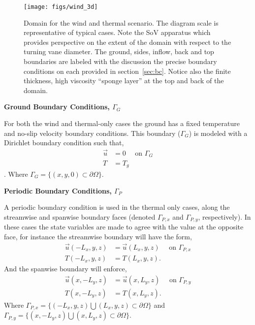 \begin{figure}[!htb]
  \begin{center}
   \texttt{[image: figs/wind\_3d]}
    \caption{Domain for the wind and thermal scenario. The diagram scale
   is representative of typical cases. Note the SoV apparatus which
   provides perspective on the extent of the domain with respect to the
   turning vane diameter. The ground, sides, inflow, back and top
   boundaries are labeled with the discussion the precise boundary
   conditions on each provided in section~\ref{sec:bc}. Notice also the
   finite thickness, high viscosity ``sponge layer'' at the top and back
   of the domain.}   
    \label{fig:wind3d}
  \end{center}
\end{figure}

\textbf{Ground Boundary Conditions, $\Gamma_G$} 

For both the wind and thermal-only cases the ground has a fixed
temperature and no-slip velocity boundary conditions. This boundary 
($\Gamma_G$) is modeled with a Dirichlet boundary condition such that, 
\begin{align}
 \overrightarrow{u} &= 0 \quad \text{ on } \Gamma_G \\
 T &= T_g
\end{align}. 
Where $\Gamma_G = \{(x,y,0) \subset \partial \Omega \} $. 

%
%
%
\textbf{Periodic Boundary Conditions, $\Gamma_P$} 

A periodic boundary condition is used in the thermal only cases, 
along the streamwise and spanwise boundary faces 
(denoted $\Gamma_{P,x}$ and $\Gamma_{P,y}$, respectively). In these cases the state variables 
are made to agree with the value at the opposite face, for instance the 
streamwise boundary will have the form, 
\begin{align}
 \overrightarrow{u}(-L_x,y,z) &= \overrightarrow{u}(L_x,y,z) \quad \text{ on } \Gamma_{P,x} \\
 T(-L_x,y,z) &= T(L_x,y,z). 
\end{align}
And the spanwise boundary will enforce, 
\begin{align}
 \overrightarrow{u}(x,-L_y,z) &= \overrightarrow{u}(x,L_y,z) \quad \text{ on } \Gamma_{P,y} \\
 T(x,-L_y,z) &= T(x,L_y,z). 
\end{align}
Where $\Gamma_{P,x} = \{(-L_x,y,z) \bigcup (L_x,y,z) \subset \partial \Omega \}$ 
and $\Gamma_{P,y} = \{(x,-L_y,z) \bigcup (x,L_y,z) \subset \partial \Omega \}$.

